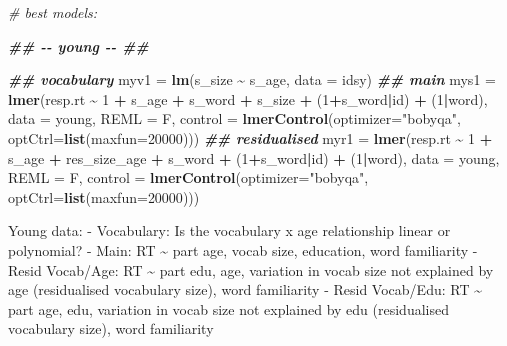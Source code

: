\documentclass[
]{article}
\newenvironment{Shaded}{\begin{snugshade}}{\end{snugshade}}
\newcommand{\AttributeTok}[1]{\textcolor[rgb]{0.13,0.29,0.53}{#1}}
\newcommand{\CommentTok}[1]{\textcolor[rgb]{0.56,0.35,0.01}{\textit{#1}}}
\newcommand{\DecValTok}[1]{\textcolor[rgb]{0.00,0.00,0.81}{#1}}
\newcommand{\DocumentationTok}[1]{\textcolor[rgb]{0.56,0.35,0.01}{\textbf{\textit{#1}}}}
\newcommand{\FunctionTok}[1]{\textcolor[rgb]{0.13,0.29,0.53}{\textbf{#1}}}
\newcommand{\NormalTok}[1]{#1}
\newcommand{\OtherTok}[1]{\textcolor[rgb]{0.56,0.35,0.01}{#1}}
\newcommand{\SpecialCharTok}[1]{\textcolor[rgb]{0.81,0.36,0.00}{\textbf{#1}}}
\newcommand{\StringTok}[1]{\textcolor[rgb]{0.31,0.60,0.02}{#1}}
\begin{document}
\begin{Shaded}
\begin{Highlighting}[]
\CommentTok{\# best models:}

\DocumentationTok{\#\# {-}{-} young {-}{-} \#\#}

\DocumentationTok{\#\# vocabulary}
\NormalTok{myv1 }\OtherTok{=} \FunctionTok{lm}\NormalTok{(s\_size }\SpecialCharTok{\textasciitilde{}}\NormalTok{ s\_age, }\AttributeTok{data =}\NormalTok{ idsy)}
\DocumentationTok{\#\# main}
\NormalTok{mys1 }\OtherTok{=} \FunctionTok{lmer}\NormalTok{(resp.rt }\SpecialCharTok{\textasciitilde{}} \DecValTok{1} \SpecialCharTok{+}\NormalTok{ s\_age }\SpecialCharTok{+}\NormalTok{ s\_word }\SpecialCharTok{+}\NormalTok{ s\_size }\SpecialCharTok{+}\NormalTok{ (}\DecValTok{1}\SpecialCharTok{+}\NormalTok{s\_word}\SpecialCharTok{|}\NormalTok{id) }\SpecialCharTok{+}\NormalTok{ (}\DecValTok{1}\SpecialCharTok{|}\NormalTok{word), }\AttributeTok{data =}\NormalTok{ young, }\AttributeTok{REML =}\NormalTok{ F, }\AttributeTok{control =} \FunctionTok{lmerControl}\NormalTok{(}\AttributeTok{optimizer=}\StringTok{"bobyqa"}\NormalTok{, }\AttributeTok{optCtrl=}\FunctionTok{list}\NormalTok{(}\AttributeTok{maxfun=}\DecValTok{20000}\NormalTok{)))}
\DocumentationTok{\#\# residualised}
\NormalTok{myr1 }\OtherTok{=} \FunctionTok{lmer}\NormalTok{(resp.rt }\SpecialCharTok{\textasciitilde{}} \DecValTok{1} \SpecialCharTok{+}\NormalTok{ s\_age }\SpecialCharTok{+}\NormalTok{ res\_size\_age }\SpecialCharTok{+}\NormalTok{ s\_word }\SpecialCharTok{+}\NormalTok{ (}\DecValTok{1}\SpecialCharTok{+}\NormalTok{s\_word}\SpecialCharTok{|}\NormalTok{id) }\SpecialCharTok{+}\NormalTok{ (}\DecValTok{1}\SpecialCharTok{|}\NormalTok{word), }\AttributeTok{data =}\NormalTok{ young, }\AttributeTok{REML =}\NormalTok{ F, }\AttributeTok{control =} \FunctionTok{lmerControl}\NormalTok{(}\AttributeTok{optimizer=}\StringTok{"bobyqa"}\NormalTok{, }\AttributeTok{optCtrl=}\FunctionTok{list}\NormalTok{(}\AttributeTok{maxfun=}\DecValTok{20000}\NormalTok{)))}
\end{Highlighting}
\end{Shaded}

Young data: - Vocabulary: Is the vocabulary x age relationship linear or
polynomial? - Main: RT \textasciitilde{} part age, vocab size,
education, word familiarity - Resid Vocab/Age: RT \textasciitilde{} part
edu, age, variation in vocab size not explained by age (residualised
vocabulary size), word familiarity - Resid Vocab/Edu: RT
\textasciitilde{} part age, edu, variation in vocab size not explained
by edu (residualised vocabulary size), word familiarity
\end{document}
